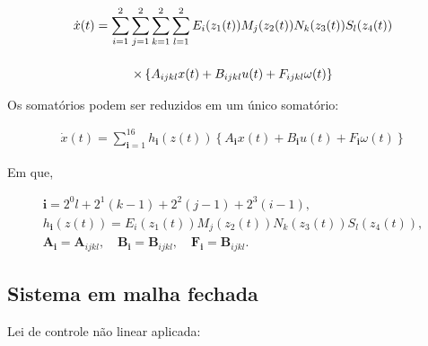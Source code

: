 



\begin{gather}
    \dot{x}(t) =
  \sum\limits_{i=1}^{2} \sum\limits_{j=1}^{2} \sum\limits_{k=1}^{2} \sum\limits_{l=1}^{2} E_i(z_1(t))M_j(z_2(t))N_k(z_3(t))S_l(z_4(t))
  \notag \\[12pt] \times
  \left\{
    A_{ijkl}x(t) + B_{ijkl}u(t) + F_{ijkl}\omega(t)
  \right\}
\end{gather}

Os somatórios podem ser reduzidos em um único somatório:

\begin{gather}
    \dot{x}(t) =
  \sum\limits_{\mathbf{i}=1}^{16} h_{\mathbf{i}}(z(t))\left\{ A_{\mathbf{i}}x(t) + B_{\mathbf{i}}u(t) + F_{\mathbf{i}}\omega(t)\right\}
\end{gather}

Em que,


\begin{gather*}
    \mathbf{i}=2^0l+2^1(k-1)+2^2(j-1)+2^3(i-1), \\
    h_\mathbf{i}(z(t))=E_i\left(z_1(t)\right) M_j\left(z_2(t)\right) N_k\left(z_3(t)\right) S_l\left(z_4(t)\right), \\
    \boldsymbol{A}_\mathbf{i}=\boldsymbol{A}_{i j k l}, \quad \boldsymbol{B}_\mathbf{i}=\boldsymbol{B}_{i j k l}, \quad \boldsymbol{F}_\mathbf{i}=\boldsymbol{B}_{i j k l} .
\end{gather*}

\subsection*{Sistema em malha fechada}
Lei de controle não linear aplicada:

